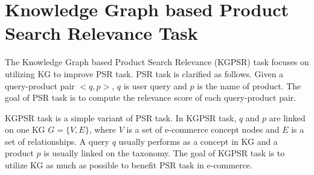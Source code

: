 \section{Knowledge Graph based Product Search Relevance Task}
The Knowledge Graph based Product Search Relevance (KGPSR) task focuses on utilizing KG to improve PSR task. PSR task is clarified as follows. Given a query-product pair $<q, p>$, $q$ is user query and $p$ is the name of product. The goal of PSR task is to compute the relevance score of each query-product pair. 

KGPSR task is a simple variant of PSR task. In KGPSR task, $q$ and $p$ are linked on one KG $G=\{V,E\}$, where $V$ is a set of e-commerce concept nodes and $E$ is a set of relationships. A query $q$ usually performs as a concept in KG and a product $p$ is usually linked on the taxonomy. The goal of KGPSR task is to utilize KG as much as possible to benefit PSR task in e-commerce.



